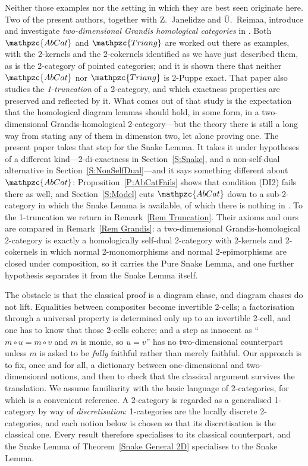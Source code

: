 \documentclass[reqno,a4paper]{amsart}
\numberwithin{equation}{section}
\theoremstyle{plain}
\theoremstyle{definition}
\def\nameit#1{\textrm{#1}~}
\def\thex{\nameit{Theorem}}
\def\prox{\nameit{Proposition}}
\def\remx{\nameit{Remark}}
\def\dfn#1{{\itshape #1}}
\newcommand{\comp}{\circ}
\newcommand{\catfont}[1]{\ensuremath{\mathpzc{#1}}\xspace}
\newcommand{\AbCat}{\catfont{AbCat}}
\newcommand{\Triang}{\catfont{Triang}}
\renewcommand{\1}{\onecat{1}}
\begin{document}
Neither those examples nor the setting in which they are best seen originate here. Two of the present authors, together with Z.~Janelidze and \"U.~Reimaa, introduce and investigate \emph{two-dimensional Grandis homological categories} in \cite{CavJanMesRei26}. Both \(\AbCat\) and \(\Triang\) are worked out there as examples, with the 2-kernels and the 2-cokernels identified as we have just described them, as is the 2-category of pointed categories; and it is shown there that neither \(\AbCat\) nor \(\Triang\) is 2-Puppe exact. That paper also studies the \emph{1-truncation} of a 2-category, and which exactness properties are preserved and reflected by it. What comes out of that study is the expectation that the homological diagram lemmas should hold, in some form, in a two-dimensional Grandis-homological 2-category---but the theory there is still a long way from stating any of them in dimension two, let alone proving one. The present paper takes that step for the Snake Lemma. It takes it under hypotheses of a different kind---2-di-exactness in Section~\ref{S:Snake}, and a non-self-dual alternative in Section~\ref{S:NonSelfDual}---and it says something different about \(\AbCat\): \prox\ref{P:AbCatFails} shows that condition \textup{(DI2)} fails there as well, and Section~\ref{S:Model} cuts \(\AbCat\) down to a sub-2-category in which the Snake Lemma is available, of which there is nothing in \cite{CavJanMesRei26}. To the 1-truncation we return in \remx\ref{Rem Truncation}. Their axioms and ours are compared in \remx\ref{Rem Grandis}: a two-dimensional Grandis-homological 2-category is exactly a homologically self-dual 2-category with 2-kernels and 2-cokernels in which normal 2-monomorphisms and normal 2-epimorphisms are closed under composition, so it carries the Pure Snake Lemma, and one further hypothesis separates it from the Snake Lemma itself.

The obstacle is that the classical proof is a diagram chase, and diagram chases do not lift. Equalities between composites become invertible 2-cells; a factorisation through a universal property is determined only up to an invertible 2-cell, and one has to know that those 2-cells cohere; and a step as innocent as ``\(m\comp u=m\comp v\) and \(m\) is monic, so \(u=v\)'' has no two-dimensional counterpart unless \(m\) is asked to be \emph{fully} faithful rather than merely faithful. Our approach is to fix, once and for all, a dictionary between one-dimensional and two-dimensional notions, and then to check that the classical argument survives the translation. We assume familiarity with the basic language of 2-categories, for which \cite{Lac10} is a convenient reference. A 2-category is regarded as a generalised 1-category by way of \dfn{discretisation}: 1-categories are the locally discrete 2-categories, and each notion below is chosen so that its discretisation is the classical one. Every result therefore specialises to its classical counterpart, and the Snake Lemma of \thex\ref{Snake General 2D} specialises to the Snake Lemma.
\end{document}

